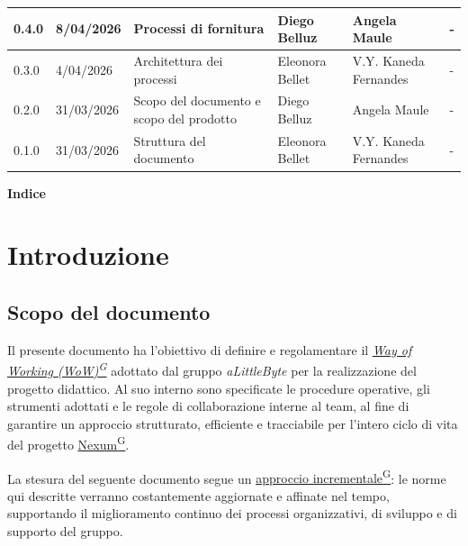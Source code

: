 \documentclass[a4paper,12pt]{article}
\providecommand{\glslink}[2]{\href{https://alittlebyte-19.github.io/Documentazione/glossario.html\#gls-#1}{\underline{#2}\textsuperscript{\scriptsize G}}}
\begin{document}
{\begin{longtable}{|p{1.1cm}|p{2.0cm}|p{4.3cm}|p{2.8cm}|p{2.0cm}|p{2.0cm}|}
        \hline
        0.4.0 & 8/04/2026 & Processi di fornitura & Diego Belluz & Angela Maule & - \\
        \hline
        0.3.0 & 4/04/2026 & Architettura dei processi & Eleonora Bellet & V.Y. Kaneda Fernandes & - \\
        \hline
        0.2.0 & 31/03/2026 & Scopo del documento e scopo del prodotto & Diego Belluz & Angela Maule & - \\
        \hline
        0.1.0 & 31/03/2026 & Struttura del documento & Eleonora Bellet & V.Y. Kaneda Fernandes & - \\
    \end{longtable}
}
\newpage

\begin{center} 
    {\Large \textbf{Indice}}
\end{center}

\vspace{0.6cm}

\tableofcontents

\newpage
{}
\setcounter{page}{4}

\section{Introduzione}

\subsection{Scopo del documento}
Il presente documento ha l'obiettivo di definire e regolamentare il \textit{\glslink{way-of-working-wow}{Way of Working (WoW)}} adottato dal gruppo \textit{aLittleByte} per la realizzazione del progetto didattico. Al suo interno sono specificate le procedure operative, gli strumenti adottati e le regole di collaborazione interne al team, al fine di garantire un approccio strutturato, efficiente e tracciabile per l'intero ciclo di vita del progetto \glslink{nexum}{Nexum}. 

La stesura del seguente documento segue un \glslink{approccio-incrementale}{approccio incrementale}: le norme qui descritte verranno costantemente aggiornate e affinate nel tempo, supportando il miglioramento continuo dei processi organizzativi, di sviluppo e di supporto del gruppo.
\end{document}
